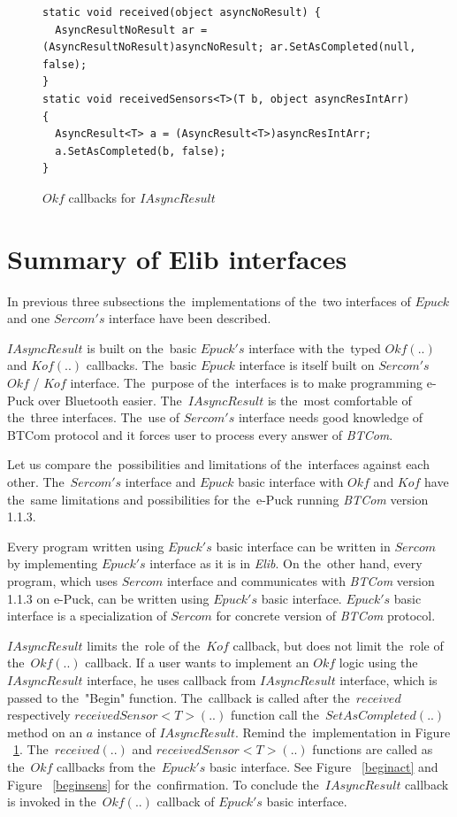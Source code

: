 \begin{figure}[!hbp]
\begin{lstlisting}
static void received(object asyncNoResult) {
  AsyncResultNoResult ar = (AsyncResultNoResult)asyncNoResult; ar.SetAsCompleted(null, false); 
}
static void receivedSensors<T>(T b, object asyncResIntArr) {
  AsyncResult<T> a = (AsyncResult<T>)asyncResIntArr;
  a.SetAsCompleted(b, false);
}
\end{lstlisting}	
\caption{$Okf$ callbacks for $IAsyncResult$} \label{Iokfs}
\end{figure}

\section{Summary of Elib interfaces}
\label{sec:suminterface}
  In previous three subsections the~implementations of the~two interfaces of $Epuck$ 
  and one $Sercom's$ interface have been described.

  $IAsyncResult$ is built on the~basic $Epuck's$ interface with the~typed $Okf(..)$ and $Kof(..)$ callbacks. 
  The~basic $Epuck$ interface is itself built on $Sercom's$ $Okf$ / $Kof$ interface.
  The~purpose of the~interfaces is to make programming e-Puck over Bluetooth easier.
  The~$IAsyncResult$ is the~most comfortable of the~three interfaces. 
  The~use of $Sercom's$ interface needs good knowledge of BTCom protocol and 
  it forces user to process every answer of {\it BTCom}.

  Let us compare the~possibilities and limitations of the~interfaces against each other.
  The~$Sercom's$ interface and $Epuck$ basic interface with $Okf$ and $Kof$ 
  have the~same limitations and possibilities for the~e-Puck running {\it BTCom} version 1.1.3. 
  
  Every program written using $Epuck's$ basic interface can be written
  in $Sercom$ by implementing $Epuck's$ interface as it is in {\it Elib}.
  On the~other hand, every program, which uses $Sercom$ interface and communicates with {\it BTCom}
  version 1.1.3 on e-Puck, can be written using $Epuck's$ basic interface. 
  $Epuck's$ basic interface is a specialization of $Sercom$ for concrete version of {\it BTCom}
  protocol.

  $IAsyncResult$ limits the~role of the~$Kof$ callback, but does not limit the~role of the~$Okf(..)$ callback.
  If a user wants to implement an $Okf$ logic using the~$IAsyncResult$ interface, he uses callback from $IAsyncResult$
  interface, which is passed to the~"Begin" function.
  The~callback is called after the~$received$ respectively $receivedSensor<T>(..)$ function  call 
  the~$SetAsCompleted(..)$ method on an $a$ instance of $IAsyncResult$. 
  Remind the~implementation in Figure ~\ref{Iokfs}.
  The~$received(..)$ and $receivedSensor<T>(..)$ functions are called as the~$Okf$ callbacks
  from the~$Epuck's$ basic interface.
  See Figure ~\ref{beginact} and Figure ~\ref{beginsens} for the~confirmation.
  To conclude the~$IAsyncResult$ callback is invoked in the~$Okf(..)$ callback of $Epuck's$ basic interface.

